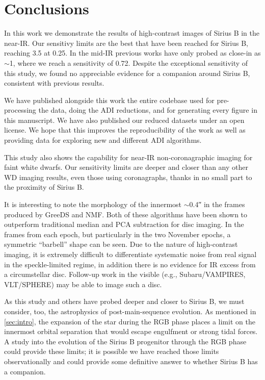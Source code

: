 \documentclass[twocolumn]{aastex631}
\begin{document}
\section{Conclusions} \label{sec:conclusion}

In this work we demonstrate the results of high-contrast images of Sirius B in the near-IR. Our sensitivy limits are the best that have been reached for Sirius B, reaching \qty{3.5}{\mj} at \qty{0.25}{\au}. In the mid-IR previous works have only probed as close-in as $\sim$\qty{1}{\au}, where we reach a sensitivity of \qty{0.72}{\mj}. Despite the exceptional sensitivity of this study, we found no appreciable evidence for a companion around Sirius B, consistent with previous results.

We have published alongside this work the entire codebase used for pre-processing the data, doing the ADI reductions, and for generating every figure in this manuscript. We have also published our reduced datasets under an open license. We hope that this improves the reproducibility of the work as well as providing data for exploring new and different ADI algorithms.

This study also shows the capability for near-IR non-coronagraphic imaging for faint white dwarfs. Our sensitivity limits are deeper and closer than any other WD imaging results, even those using coronagraphs, thanks in no small part to the proximity of Sirius B.

It is interesting to note the morphology of the innermost $\sim$\ang{;;0.4} in the frames produced by GreeDS and NMF. Both of these algorithms have been shown to outperform traditional median and PCA subtraction for disc imaging. In the frames from each epoch, but particularly in the two November epochs, a symmetric ``barbell'' shape can be seen. Due to the nature of high-contrast imaging, it is extremely difficult to differentiate systematic noise from real signal in the speckle-limited regime, in addition there is no evidence for IR excess from a circumstellar disc. Follow-up work in the visible (e.g., Subaru/VAMPIRES, VLT/SPHERE) may be able to image such a disc.

As this study and others have probed deeper and closer to Sirius B, we must consider, too, the astrophysics of post-main-sequence evolution. As mentioned in \autoref{sec:intro}, the expansion of the star during the RGB phase places a limit on the innermost orbital separation that would escape engulfment or strong tidal forces. A study into the evolution of the Sirius B progenitor through the RGB phase could provide these limits; it is possible we have reached those limits observationally and could provide some definitive answer to whether Sirius B has a companion.
\end{document}
